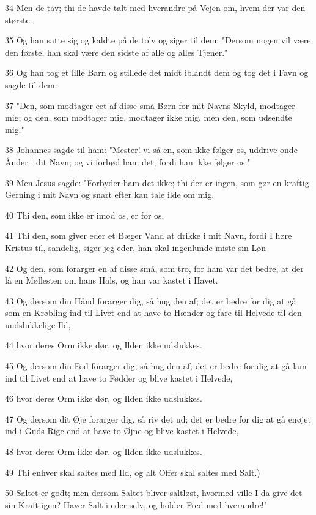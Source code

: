 \par 34 Men de tav; thi de havde talt med hverandre på Vejen om, hvem der var den største.
\par 35 Og han satte sig og kaldte på de tolv og siger til dem: "Dersom nogen vil være den første, han skal være den sidste af alle og alles Tjener."
\par 36 Og han tog et lille Barn og stillede det midt iblandt dem og tog det i Favn og sagde til dem:
\par 37 "Den, som modtager eet af disse små Børn for mit Navns Skyld, modtager mig; og den, som modtager mig, modtager ikke mig, men den, som udsendte mig."
\par 38 Johannes sagde til ham: "Mester! vi så en, som ikke følger os, uddrive onde Ånder i dit Navn; og vi forbød ham det, fordi han ikke følger os."
\par 39 Men Jesus sagde: "Forbyder ham det ikke; thi der er ingen, som gør en kraftig Gerning i mit Navn og snart efter kan tale ilde om mig.
\par 40 Thi den, som ikke er imod os, er for os.
\par 41 Thi den, som giver eder et Bæger Vand at drikke i mit Navn, fordi I høre Kristus til, sandelig, siger jeg eder, han skal ingenlunde miste sin Løn
\par 42 Og den, som forarger en af disse små, som tro, for ham var det bedre, at der lå en Møllesten om hans Hals, og han var kastet i Havet.
\par 43 Og dersom din Hånd forarger dig, så hug den af; det er bedre for dig at gå som en Krøbling ind til Livet end at have to Hænder og fare til Helvede til den uudslukkelige Ild,
\par 44 hvor deres Orm ikke dør, og Ilden ikke udslukkes.
\par 45 Og dersom din Fod forarger dig, så hug den af; det er bedre for dig at gå lam ind til Livet end at have to Fødder og blive kastet i Helvede,
\par 46 hvor deres Orm ikke dør, og Ilden ikke udslukkes.
\par 47 Og dersom dit Øje forarger dig, så riv det ud; det er bedre for dig at gå enøjet ind i Guds Rige end at have to Øjne og blive kastet i Helvede,
\par 48 hvor deres Orm ikke dør, og Ilden ikke udslukkes.
\par 49 Thi enhver skal saltes med Ild, og alt Offer skal saltes med Salt.)
\par 50 Saltet er godt; men dersom Saltet bliver saltløst, hvormed ville I da give det sin Kraft igen? Haver Salt i eder selv, og holder Fred med hverandre!"

